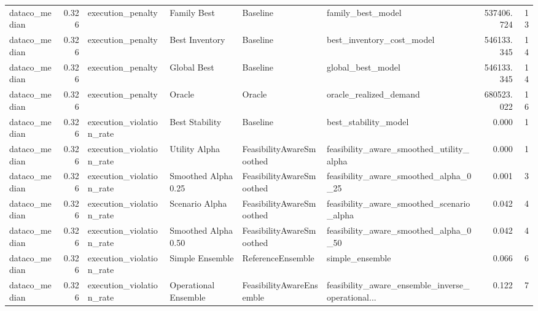 \begin{table}
{\begin{tabular}{lrllllrr}
 dataco\_median &             0.326 &           execution\_penalty &           Family Best &                  Baseline &                                  family\_best\_model &    537406.724 &              13 \\
 dataco\_median &             0.326 &           execution\_penalty &        Best Inventory &                  Baseline &                          best\_inventory\_cost\_model &    546133.345 &              14 \\
 dataco\_median &             0.326 &           execution\_penalty &           Global Best &                  Baseline &                                  global\_best\_model &    546133.345 &              14 \\
 dataco\_median &             0.326 &           execution\_penalty &                Oracle &                    Oracle &                             oracle\_realized\_demand &    680523.022 &              16 \\
 dataco\_median &             0.326 &    execution\_violation\_rate &        Best Stability &                  Baseline &                               best\_stability\_model &         0.000 &               1 \\
 dataco\_median &             0.326 &    execution\_violation\_rate &         Utility Alpha &  FeasibilityAwareSmoothed &           feasibility\_aware\_smoothed\_utility\_alpha &         0.000 &               1 \\
 dataco\_median &             0.326 &    execution\_violation\_rate &   Smoothed Alpha 0.25 &  FeasibilityAwareSmoothed &              feasibility\_aware\_smoothed\_alpha\_0\_25 &         0.001 &               3 \\
 dataco\_median &             0.326 &    execution\_violation\_rate &        Scenario Alpha &  FeasibilityAwareSmoothed &          feasibility\_aware\_smoothed\_scenario\_alpha &         0.042 &               4 \\
 dataco\_median &             0.326 &    execution\_violation\_rate &   Smoothed Alpha 0.50 &  FeasibilityAwareSmoothed &              feasibility\_aware\_smoothed\_alpha\_0\_50 &         0.042 &               4 \\
 dataco\_median &             0.326 &    execution\_violation\_rate &       Simple Ensemble &         ReferenceEnsemble &                                    simple\_ensemble &         0.066 &               6 \\
 dataco\_median &             0.326 &    execution\_violation\_rate &  Operational Ensemble &  FeasibilityAwareEnsemble &  feasibility\_aware\_ensemble\_inverse\_operational... &         0.122 &               7 \\

\end{tabular}}
\end{table}
